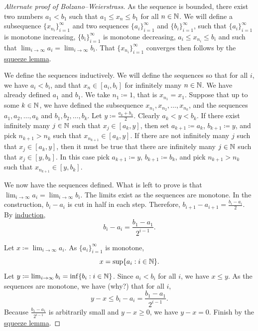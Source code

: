 \begin{proof}[Alternate proof of Bolzano--Weierstrass]
As the sequence is bounded, there exist two numbers $a_1 < b_1$
such that $a_1 \leq x_n \leq b_1$ for all $n \in {\mathbb{N}}$.
We will define a subsequence $\{ x_{n_i} \}_{i=1}^\infty$ and two
sequences $\{ a_i \}_{i=1}^\infty$ and $\{ b_i \}_{i=1}^\infty$, such that
$\{ a_i \}_{i=1}^\infty$ is monotone increasing, $\{ b_i \}_{i=1}^\infty$ is monotone decreasing,
$a_i \leq x_{n_i} \leq b_i$ and such that $\lim_{i\to\infty} a_i =
\lim_{i\to\infty} b_i$.   That
$\{ x_{n_i} \}_{i=1}^\infty$ converges then follows by the \hyperref[squeeze:lemma]{squeeze lemma}.

We define the sequences inductively.  We will define the sequences so that
for all $i$, we have $a_i < b_i$,
and that $x_n \in [a_i,b_i]$ for infinitely many $n \in {\mathbb{N}}$.
We have already defined $a_1$ and $b_1$.  We take $n_1 \coloneqq 1$, that is
$x_{n_1} = x_1$.
Suppose that up to some $k \in {\mathbb{N}}$,
we have defined the subsequence $x_{n_1}, x_{n_2}, \ldots,
x_{n_k}$, and the sequences $a_1,a_2,\ldots,a_k$
and $b_1,b_2,\ldots,b_k$.
Let $y \coloneqq \frac{a_k+b_k}{2}$.
Clearly
$a_k < y < b_k$.  If there exist infinitely many $j \in {\mathbb{N}}$
such that $x_j \in [a_k,y]$, then set $a_{k+1} \coloneqq a_k$, $b_{k+1}
\coloneqq y$,
and pick $n_{k+1} > n_{k}$
such that $x_{n_{k+1}} \in [a_k,y]$.  If there are not infinitely many 
$j$ such that 
$x_j \in [a_k,y]$, then it must be true that there are infinitely many $j \in
{\mathbb{N}}$ such that 
$x_j \in [y,b_k]$.  In this case pick $a_{k+1} \coloneqq y$, $b_{k+1}
\coloneqq b_k$,
and pick $n_{k+1} > n_{k}$
such that $x_{n_{k+1}} \in [y,b_k]$.

We now have the sequences defined.  What is left to prove is that
$\lim_{i\to\infty} a_i = \lim_{i\to\infty} b_i$.  The limits exist as the sequences
are monotone.  In the construction,
$b_i - a_i$ is cut in half in each step.  Therefore,
$b_{i+1} - a_{i+1} = \frac{b_i-a_i}{2}$.  By
\hyperref[induction:thm]{induction},
\begin{equation*}
b_i - a_i = \frac{b_1-a_1}{2^{i-1}} .
\end{equation*}

Let $x \coloneqq \lim_{i\to\infty} a_i$.  As $\{ a_i \}_{i=1}^\infty$ is monotone,
\begin{equation*}
x = \sup \{ a_i : i \in {\mathbb{N}} \} .
\end{equation*}
Let $y \coloneqq \lim_{i\to\infty} b_i = \inf \{ b_i : i \in {\mathbb{N}} \}$.  Since $a_i < b_i$ for
all $i$, we have $x \leq y$.
As the sequences are monotone, we have (why?) that for all $i$,
\begin{equation*}
y-x \leq b_i-a_i = \frac{b_1-a_1}{2^{i-1}} .
\end{equation*}
Because $\frac{b_1-a_1}{2^{i-1}}$ is arbitrarily small and $y-x \geq 0$,
we have $y-x = 0$.  Finish by the \hyperref[squeeze:lemma]{squeeze lemma}.
\end{proof}

